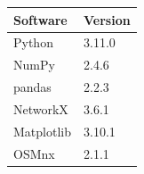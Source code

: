 \begin{tabular}{ll}
\toprule
Software & Version \\
\midrule
Python & 3.11.0 \\
NumPy & 2.4.6 \\
pandas & 2.2.3 \\
NetworkX & 3.6.1 \\
Matplotlib & 3.10.1 \\
OSMnx & 2.1.1 \\
\bottomrule
\end{tabular}
